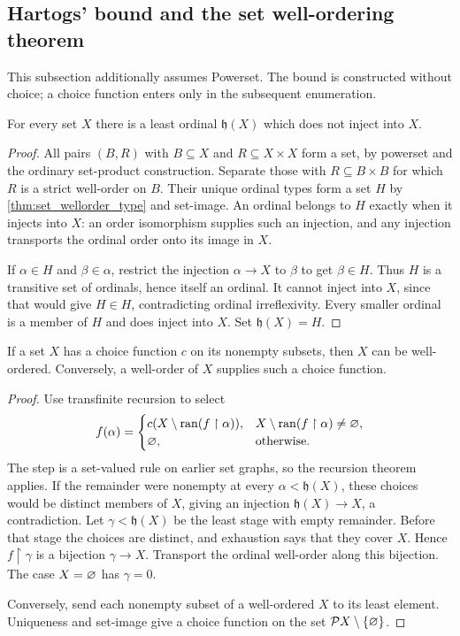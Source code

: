 \subsection{Hartogs' bound and the set well-ordering theorem}
This subsection additionally assumes Powerset. The bound is constructed
without choice; a choice function enters only in the subsequent enumeration.

\begin{theorem}
\label{thm:hartogs_bound}
For every set $X$ there is a least ordinal $\mathfrak h(X)$ which does
not inject into $X$.
\end{theorem}
\begin{proof}
All pairs $(B,R)$ with $B\subseteq X$ and $R\subseteq X\times X$
form a set, by powerset and the ordinary set-product construction.
Separate those with $R\subseteq B\times B$ for which $R$ is a strict
well-order on $B$. Their unique
ordinal types form a set $H$ by \ref{thm:set_wellorder_type} and
set-image. An ordinal belongs to $H$ exactly when it injects into $X$:
an order isomorphism supplies such an injection, and any injection
transports the ordinal order onto its image in $X$.

If $\alpha\in H$ and $\beta\in\alpha$, restrict the injection
$\alpha\to X$ to $\beta$ to get $\beta\in H$. Thus $H$ is a
transitive set of ordinals, hence itself an ordinal. It cannot inject
into $X$, since that would give $H\in H$, contradicting ordinal
irreflexivity. Every smaller ordinal is a member of $H$ and does inject
into $X$. Set $\mathfrak h(X)=H$.
\end{proof}

\begin{theorem}
If a set $X$ has a choice function $c$ on its nonempty subsets, then
$X$ can be well-ordered. Conversely, a well-order of $X$ supplies such
a choice function.
\end{theorem}
\begin{proof}
Use transfinite recursion to select
\[
f(\alpha)=
\begin{cases}
c(X\setminus\operatorname{ran}(f\restriction\alpha)),
 & X\setminus\operatorname{ran}(f\restriction\alpha)\ne\varnothing,\\
\varnothing,&\text{otherwise}.
\end{cases}
\]
The step is a set-valued rule on earlier set graphs, so the recursion
theorem applies. If the remainder were nonempty at every
$\alpha<\mathfrak h(X)$, these choices would be distinct members of
$X$, giving an injection $\mathfrak h(X)\to X$, a contradiction.
Let $\gamma<\mathfrak h(X)$ be the least stage with empty remainder.
Before that stage the choices are distinct, and exhaustion says that
they cover $X$. Hence $f\restriction\gamma$ is a bijection
$\gamma\to X$. Transport the ordinal well-order along this bijection.
The case $X=\varnothing$ has $\gamma=0$.

Conversely, send each nonempty subset of a well-ordered $X$ to its least
element. Uniqueness and set-image give a choice function on the set
$\mathcal{P} X\setminus\{\varnothing\}$.
\end{proof}

